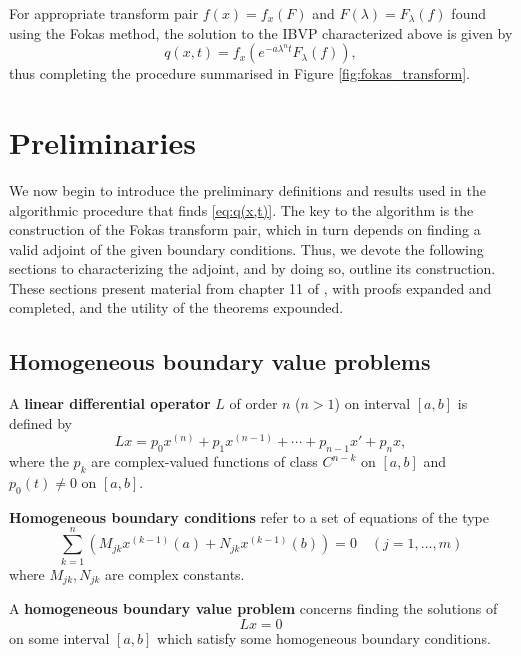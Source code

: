 \documentclass[12pt, oneside, a4paper]{article}
\begin{document}
For appropriate transform pair $f(x)=f_x(F)$ and $F(\lambda)=F_\lambda(f)$ found using the Fokas method, the solution to the IBVP characterized above is given by \cite[p.15]{Smith2016}
\begin{equation}\label{eq:q(x,t)}
    q(x,t) = f_x(e^{-a\lambda^n t}F_\lambda(f)),
\end{equation}
thus completing the procedure summarised in Figure \ref{fig:fokas_transform}.

\section{Preliminaries}
We now begin to introduce the preliminary definitions and results used in the algorithmic procedure that finds \eqref{eq:q(x,t)}. The key to the algorithm is the construction of the Fokas transform pair, which in turn depends on finding a valid adjoint of the given boundary conditions. Thus, we devote the following sections to characterizing the adjoint, and by doing so, outline its construction. These sections present material from chapter 11 of \cite{CoddingtonLevinson}, with proofs expanded and completed, and the utility of the theorems expounded.

\subsection{Homogeneous boundary value problems}
\begin{defn}\cite[p.81]{CoddingtonLevinson}\label{defn:linear differential operator}
    A \textbf{linear differential operator} $L$ of order $n$ ($n>1$) on interval $[a,b]$ is defined by
    \[Lx = p_0x^{(n)} + p_1x^{(n-1)} + \cdots + p_{n-1}x' + p_nx,\]
    where the $p_k$ are complex-valued functions of class $C^{n-k}$ on $[a,b]$ and $p_0(t)\neq 0$ on $[a,b]$.
\end{defn}

\begin{defn}\cite[p.284]{CoddingtonLevinson}\label{defn:homogeneous boundary conditions}
    \textbf{Homogeneous boundary conditions} refer to a set of equations of the type
    \begin{equation}\label{eq:homogeneous boundary conditions}
        \sum_{k=1}^n (M_{jk}x^{(k-1)}(a) + N_{jk}x^{(k-1)}(b))=0 \quad (j=1,\ldots,m) 
    \end{equation}
    where $M_{jk}, N_{jk}$ are complex constants.
\end{defn}

\begin{defn}\cite[p.284]{CoddingtonLevinson}\label{defn:homogeneous boundary value problem}
    A \textbf{homogeneous boundary value problem} concerns finding the solutions of 
    \[Lx=0\] on some interval $[a,b]$ which satisfy some homogeneous boundary conditions.
\end{defn}
\end{document}

